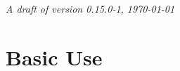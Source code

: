 \documentclass[12pt,fleqn]{book} %
\begin{document}
\noindent \textit{A draft of version 0.15.0-1, \today} %



\pagestyle{empty} %

\tableofcontents %

\cleardoublepage %

\pagestyle{fancy} %



\part{Basic Use}












\end{document}
